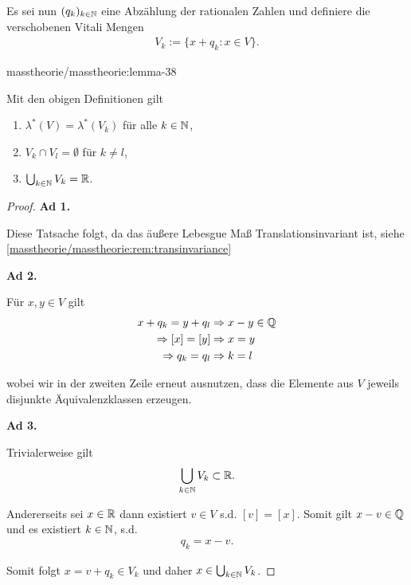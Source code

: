 \par
Es sei nun \((q_k)_{k\in\mathbb{N}}\) eine Abzählung der rationalen Zahlen und definiere die verschobenen Vitali Mengen
\begin{align*}
V_k :=\{x+q_k: x\in V\}.
\end{align*}\begin{lemma}{}{masstheorie/masstheorie:lemma-38}



\par
Mit den obigen Definitionen gilt
\begin{enumerate}

\item {} 
\par
\(\lambda^\ast(V) = \lambda^\ast(V_k)\) für alle \(k\in\mathbb{N}\),

\item {} 
\par
\(V_k\cap V_l=\emptyset\) für \(k\neq l\),

\item {} 
\par
\(\bigcup_{k\in\mathbb{N}} V_k = \mathbb{R}\).

\end{enumerate}
\end{lemma}

\begin{proof}
 

\par
\textbf{Ad 1.}

\par
Diese Tatsache folgt, da das äußere Lebesgue Maß Translationsinvariant ist, siehe \cref{masstheorie/masstheorie:rem:transinvariance} 

\par
\textbf{Ad 2.}

\par
Für \(x,y\in V\) gilt
\begin{align*}
x + q_k = y + q_l&\Rightarrow x-y\in\mathbb{Q}\\
\Rightarrow [x]=[y]&\Rightarrow x=y\\
\Rightarrow q_k=q_l&\Rightarrow k=l
\end{align*}
\par
wobei wir in der zweiten Zeile erneut ausnutzen, dass die Elemente aus \(V\) jeweils disjunkte Äquivalenzklassen erzeugen.

\par
\textbf{Ad 3.}

\par
Trivialerweise gilt
\begin{align*}
\bigcup_{k\in\mathbb{N}} V_k \subset \mathbb{R}.
\end{align*}
\par
Andererseits sei \(x\in\mathbb{R}\) dann existiert \(v\in V\) s.d. \([v] = [x]\). Somit gilt \(x-v\in\mathbb{Q}\) und es existiert \(k\in\mathbb{N}\), s.d.
\begin{align*}
q_k = x-v.
\end{align*}
\par
Somit folgt \(x=v+q_k\in V_k\) und daher \(x\in\bigcup_{k\in\mathbb{N}} V_k\).
\end{proof}

